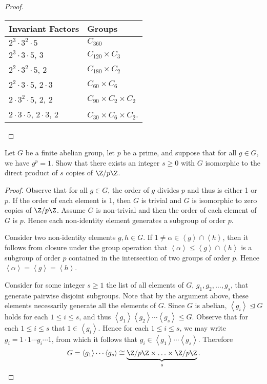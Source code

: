 \documentclass[10pt]{amsart}
\begin{document}
\begin{thm}
\begin{proof}
\begin{enumerate}[(a)]
      \begin{center}
        \begin{tabular}{l | l}
          Invariant Factors & Groups\\
          \hline
          $2^3 \cdot 3^2 \cdot 5$ & $C_{360}$\\
          $2^3 \cdot 3 \cdot 5$, 3 & $C_{120} \times C_3$\\
          $2^2 \cdot 3^2 \cdot 5$, 2 & $C_{180} \times C_2$\\
          $2^2 \cdot 3 \cdot 5$, $2 \cdot 3$ & $C_{60} \times C_6$\\
          $2 \cdot 3^2 \cdot 5$, 2, 2 & $C_{90} \times C_2 \times C_2$\\
          $2 \cdot 3 \cdot 5$, $2\cdot 3$, 2 & $C_{30} \times C_6 \times C_2$.\\
        \end{tabular}
      \end{center}
    \end{enumerate}
  \end{proof}
\end{thm}

\begin{thm}
  Let $G$ be a finite abelian group, let $p$ be a prime, and suppose that for all $g \in G$, we have $g^p = 1$.
  Show that there exists an integer $s \geq 0$ with $G$ isomorphic to the direct product of $s$ copies of $\Z/p\Z$.
  \begin{proof}
    Observe that for all $g \in G$, the order of $g$ divides $p$ and thus is either 1 or $p$.
    If the order of each element is 1, then $G$ is trivial and $G$ is isomorphic to zero copies of $\Z/p\Z$.
    Assume $G$ is non-trivial and then the order of each element of $G$ is $p$.
    Hence each non-identity element generates a subgroup of order $p$.
    
    Consider two non-identity elements $g,h \in G$.
    If $1 \not = \alpha \in \left<g\right> \cap \left<h\right>$, then it follows from closure under the group operation that $\left<\alpha\right> \leq \left<g\right> \cap \left<h\right>$ is a subgroup of order $p$ contained in the intersection of two groups of order $p$.
    Hence $\left<\alpha\right> = \left<g\right> = \left<h\right>$.
    
    Consider for some integer $s \geq 1$ the list of all elements of $G$, $g_1, g_2, \ldots, g_s$, that generate pairwise disjoint subgroups.
    Note that by the argument above, these elements necessarily generate all the elements of $G$.
    Since $G$ is abelian, $\left<g_i\right> \unlhd G$ holds for each $1 \leq i \leq s$, and thus $\left< g_1 \right>\left< g_2 \right> \cdots \left< g_s \right> \leq G$.
    Observe that for each $1 \leq i \leq s$ that $1 \in \left<g_i\right>$.
    Hence for each $1 \leq i \leq s$, we may write $g_i = 1 \cdot 1 \cdots g_i \cdots 1$, from which it follows that $g_i \in \left< g_1 \right> \cdots \left< g_s \right>$.
    Therefore $$G =  \left< g_1 \right> \cdots \left< g_s \right> \cong \underbrace{\Z/p\Z \times \ldots \times \Z/p\Z}_s.$$
  \end{proof}
\end{thm}
\end{document}
